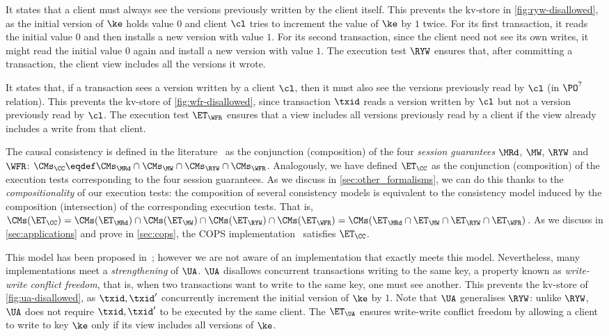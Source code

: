 It states that a client must always see the versions previously written by the client itself.
This prevents the kv-store in \cref{fig:ryw-disallowed}, 
as the initial version of $\ke$ holds value $0$ 
and client $\cl$ tries to increment the value of $\ke$ by $1$ twice.  
For its first transaction, it reads the initial value $0$ and then installs a new version with value $1$. 
For its second transaction, since the client need not see its own writes, 
it might read the initial value $0$ again and install a new version with value $1$.
The execution test $\RYW$ ensures that, after committing a transaction, 
the client view includes all the versions it wrote.  

It states that, if a transaction sees a version written by a
client $\cl$, then it must also see the versions previously read by $\cl$ (in $\PO^?$ relation).
This prevents the kv-store of \cref{fig:wfr-disallowed},
since transaction $\txid$ reads a version written by $\cl$ but
not a version previously read by $\cl$.
The execution test $\ET_{\WFR}$ ensures
that a view includes all versions previously read by a client 
if the view already includes a write from that client. 


The causal consistency is defined in the literature~\cite{session2causal} 
as the conjunction (composition) of the four \emph{session guarantees} \(\MRd\), \(\MW\), \(\RYW\) and \(\WFR\):   
$\CMs_{\CC} \eqdef \CMs_{\MRd} \cap \CMs_{\MW} \cap \CMs_{\RYW} \cap \CMs_{\WFR}$. 
Analogously, we have defined $\ET_\CC$ as the conjunction (composition) of the execution tests corresponding to the four session guarantees.
As we discuss in \cref{sec:other_formalisms}, we can do this thanks to the \emph{compositionality} of our execution tests:
the composition of several consistency models is equivalent to the consistency model induced by the composition (intersection) of the corresponding execution tests. 
That is, $\CMs(\ET_\CC) = \CMs(\ET_{\MRd}) \cap \CMs(\ET_{\MW}) \cap
\CMs(\ET_{\RYW}) \cap \CMs(\ET_{\WFR}) = \CMs(\ET_{\MRd} \cap
\ET_{\MW} \cap \ET_{\RYW} \cap \ET_{\WFR})$.
As we discuss in \cref{sec:applications} and prove in \ref{sec:cops}, the COPS
implementation~\cite{cops} satisfies $\ET_{\CC}$. 

This model has been proposed in~\cite{framework-concur};
however we are not aware of an implementation that exactly meets  this model.
Nevertheless, many implementations meet a
\emph{strengthening} of $\UA$.
$\UA$ disallows concurrent transactions writing to the same key,
a property known as \emph{write-write conflict freedom}, that is, 
when two transactions want to write to the same key, one must see another.
This prevents the kv-store of \cref{fig:ua-disallowed},
as $\txid, \txid'$ concurrently increment the initial version of $\ke$ by $1$.
Note that $\UA$ generalises $\RYW$: unlike $\RYW$, $\UA$ does not require $\txid, \txid'$ to be executed by the same client.
The $\ET_\UA$ ensures write-write conflict freedom by allowing a client to write to key $\ke$
only if its view includes all versions of $\ke$.

